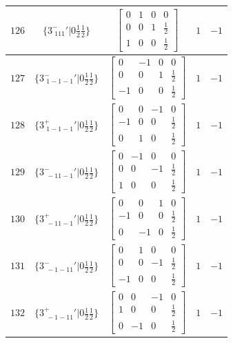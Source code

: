 \documentclass[fleqn,8pt]{jsarticle}
\begin{document}
\begin{longtable}{ccccc}
$ 126 $ & $ \{3^{-}_{\,\,111}{}'|0 \frac{1}{2} \frac{1}{2}\} $ & $ \begin{bmatrix} 0 & 1 & 0 & 0 \\ 0 & 0 & 1 & \frac{1}{2} \\ 1 & 0 & 0 & \frac{1}{2} \end{bmatrix} $ & $ 1 $ & $ -1 $ \\ \hline
$ 127 $ & $ \{3^{-}_{\,\,1-1-1}{}'|0 \frac{1}{2} \frac{1}{2}\} $ & $ \begin{bmatrix} 0 & -1 & 0 & 0 \\ 0 & 0 & 1 & \frac{1}{2} \\ -1 & 0 & 0 & \frac{1}{2} \end{bmatrix} $ & $ 1 $ & $ -1 $ \\ \hline
$ 128 $ & $ \{3^{+}_{\,\,1-1-1}{}'|0 \frac{1}{2} \frac{1}{2}\} $ & $ \begin{bmatrix} 0 & 0 & -1 & 0 \\ -1 & 0 & 0 & \frac{1}{2} \\ 0 & 1 & 0 & \frac{1}{2} \end{bmatrix} $ & $ 1 $ & $ -1 $ \\ \hline
$ 129 $ & $ \{3^{-}_{\,\,-11-1}{}'|0 \frac{1}{2} \frac{1}{2}\} $ & $ \begin{bmatrix} 0 & -1 & 0 & 0 \\ 0 & 0 & -1 & \frac{1}{2} \\ 1 & 0 & 0 & \frac{1}{2} \end{bmatrix} $ & $ 1 $ & $ -1 $ \\ \hline
$ 130 $ & $ \{3^{+}_{\,\,-11-1}{}'|0 \frac{1}{2} \frac{1}{2}\} $ & $ \begin{bmatrix} 0 & 0 & 1 & 0 \\ -1 & 0 & 0 & \frac{1}{2} \\ 0 & -1 & 0 & \frac{1}{2} \end{bmatrix} $ & $ 1 $ & $ -1 $ \\ \hline
$ 131 $ & $ \{3^{-}_{\,\,-1-11}{}'|0 \frac{1}{2} \frac{1}{2}\} $ & $ \begin{bmatrix} 0 & 1 & 0 & 0 \\ 0 & 0 & -1 & \frac{1}{2} \\ -1 & 0 & 0 & \frac{1}{2} \end{bmatrix} $ & $ 1 $ & $ -1 $ \\ \hline
$ 132 $ & $ \{3^{+}_{\,\,-1-11}{}'|0 \frac{1}{2} \frac{1}{2}\} $ & $ \begin{bmatrix} 0 & 0 & -1 & 0 \\ 1 & 0 & 0 & \frac{1}{2} \\ 0 & -1 & 0 & \frac{1}{2} \end{bmatrix} $ & $ 1 $ & $ -1 $ \\ \hline

\end{longtable}
\end{document}
